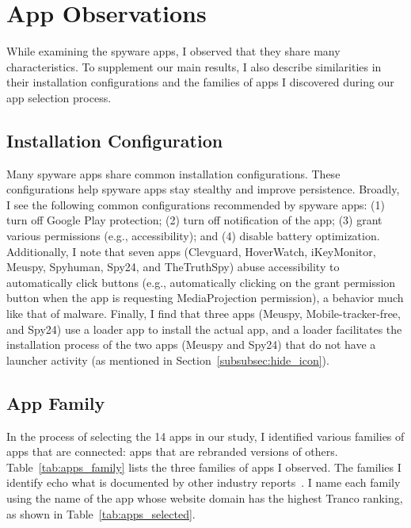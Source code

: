 \hspace*{0.1in}\newpage
\appendix


\section{App Observations}
\label{subsec:additional_observation}

While examining the spyware apps, I observed that they
share many characteristics.  To supplement our main results, I also
describe similarities in their installation configurations and the
families of apps I discovered during our app selection process.

\subsection{Installation Configuration}
\label{subsubsec:install_configure}

Many spyware apps share common installation configurations.  These
configurations help spyware apps stay stealthy and improve
persistence. Broadly, I see the following common configurations
recommended by spyware apps: (1) turn off Google Play protection; (2)
turn off notification of the app; (3) grant various permissions (e.g.,
accessibility); and (4) disable battery optimization.  Additionally,
I note that seven apps (Clevguard, HoverWatch, iKeyMonitor, Meuspy, Spyhuman, Spy24, and TheTruthSpy) abuse accessibility to
automatically click buttons (e.g., automatically clicking on the grant permission button when the app is requesting MediaProjection permission), a
behavior much like that of malware. Finally, I find that three apps
(Meuspy, Mobile-tracker-free, and Spy24) use a loader app to install
the actual app, and a loader facilitates the installation process of the two apps (Meuspy and Spy24) that do not have a launcher activity (as mentioned in Section~\ref{subsubsec:hide_icon}).

\subsection{App Family}
\label{subsubsec:app_family}

In the process of selecting the 14 apps in our study, I identified
various families of apps that are connected: apps
that are rebranded versions of others.  Table~\ref{tab:apps_family} lists the
three families of apps I observed. The families I identify echo what is documented by
other industry reports~\cite{Tekstalk86:online,
esetandr4:online}. I name each family using the name
of the app whose website domain has the highest Tranco ranking, as shown in
Table~\ref{tab:apps_selected}.

